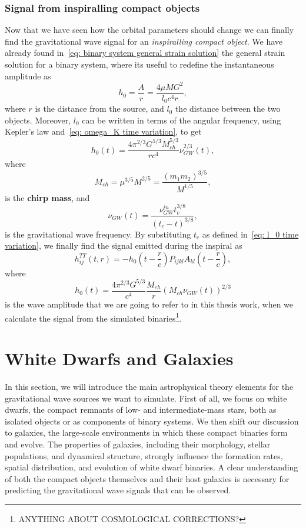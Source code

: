 \subsubsection{Signal from inspiralling compact objects}
Now that we have seen how the orbital parameters should change we can finally find the gravitational wave signal for an \textit{inspiralling compact object}.
We have already found in~\eqref{eq: binary system general strain solution} the general strain solution for a binary system, where its useful to redefine the instantaneous amplitude as
\[
    h_0 = \frac{A}{r} = \frac{4\mu M G^2}{l_0c^4r},
\]
where $r$ is the distance from the source, and $l_0$ the distance between the two objects.
Moreover, $l_0$ can be written in terms of the angular frequency, using Kepler's law and~\eqref{eq: omega_K time variation}, to get
\[
    h_0(t)=\frac{4\pi^{2/3}G^{5/3}M_{ch}^{5/3}}{rc^4}\nu_{GW}^{2/3}(t),
\]
where
\begin{equation}
    M_{ch} = \mu^{3/5}M^{2/5} = \frac{(m_1m_2)^{3/5}}{M^{1/5}},
    \label{eq: chirp mass definition}
\end{equation}
is the \textbf{chirp mass}, and 
\begin{equation}
    \nu_{GW}(t)=\frac{\nu_{GW}^{in}t_c^{3/8}}{(t_c-t)^{3/8}},
    \label{eq: nu time variation}
\end{equation}
is the gravitational wave frequency.
By substituting $t_c$ as defined in~\eqref{eq: l_0 time variation}, we finally find the signal emitted during the inspiral as
\begin{equation}
    h_{ij}^{TT}(t,r)= -h_0\left(t-\frac{r}{c}\right)P_{ijkl}A_{kl}\left(t-\frac{r}{c}\right),
    \label{eq: full inspiral signal}
\end{equation}
where
\begin{equation}
    \boxed{h_0(t)= \frac{4\pi^{2/3}G^{5/3}}{c^4}\frac{M_{ch}}{r}(M_{ch}\nu_{GW}(t))^{2/3}}
    \label{eq: the strain we use}
\end{equation}
is the wave amplitude that we are going to refer to in this thesis work, when we calculate the signal from the simulated binaries\footnote{ANYTHING ABOUT COSMOLOGICAL CORRECTIONS?}.

\section{White Dwarfs and Galaxies}
In this section, we will introduce the main astrophysical theory elements for the gravitational wave sources we want to simulate.
First of all, we focus on white dwarfs, the compact remnants of low- and intermediate-mass stars, both as isolated objects or as components of binary systems.  
We then shift our discussion to galaxies, the large-scale environments in which these compact binaries form and evolve. 
The properties of galaxies, including their morphology, stellar populations, and dynamical structure, strongly influence the formation rates, spatial distribution, and evolution of white dwarf binaries. 
A clear understanding of both the compact objects themselves and their host galaxies is necessary for predicting the gravitational wave signals that can be observed.

